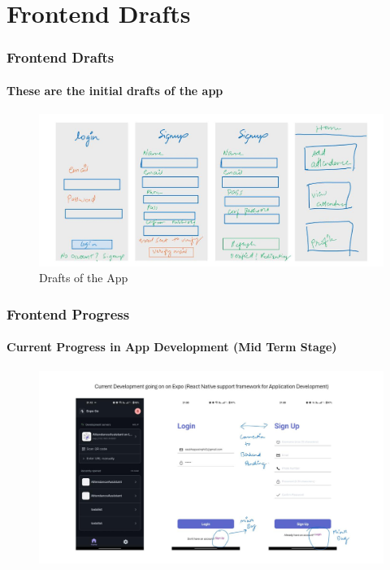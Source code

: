 \documentclass[aspectratio=169]{beamer}
\begin{document}
\section{Frontend Drafts}
\begin{frame}
	\centering
	\frametitle{Frontend Drafts}
	\framesubtitle{These are the initial drafts of the app}
	\begin{figure}[H]
		\centering
		\includegraphics[width=.95\textwidth]{../../Diagrams/first 4.jpg}
		\caption{Drafts of the App}
	\end{figure}
\end{frame}


\begin{frame}
	\centering
	\frametitle{Frontend Progress}
	\framesubtitle{Current Progress in App Development (Mid Term Stage)}
	\begin{figure}[H]
		\centering
		\includegraphics[width=.99\textwidth]{../../Frontend Status/Mid Term/frontend app status for mini proj eval.jpg}
	\end{figure}
\end{frame}
\end{document}
